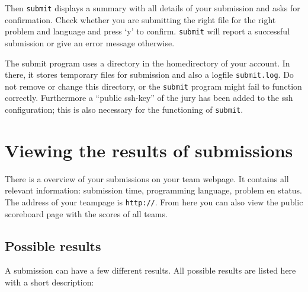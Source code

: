 \documentclass[11pt,a4paper]{article}
\newcommand{\url}[1]{\texttt{#1}}
\begin{document}
Then \texttt{submit} displays a summary with all details of your
submission and asks for confirmation. Check whether you are submitting
the right file for the right problem and language and press `y' to
confirm. \texttt{submit} will report a successful submission or give
an error message otherwise.

The submit program uses a directory \texttt{\USERSUBMITDIR} in the
homedirectory of your account. In there, it stores temporary files for
submission and also a logfile \texttt{submit.log}. Do not remove or
change this directory, or the \texttt{submit} program might fail to
function correctly. Furthermore a ``public ssh-key'' of the jury has
been added to the ssh configuration; this is also necessary for the
functioning of \texttt{submit}.

\section{Viewing the results of submissions}

There is a overview of your submissions on your team webpage.
It contains all relevant information: submission time, programming
language, problem en status. The address of your teampage is
\url{http://\WEBSERVER}. From here you can also view the public
scoreboard page with the scores of all teams.

\subsection{Possible results}

A submission can have a few different results. All possible results
are listed here with a short description:
\end{document}
